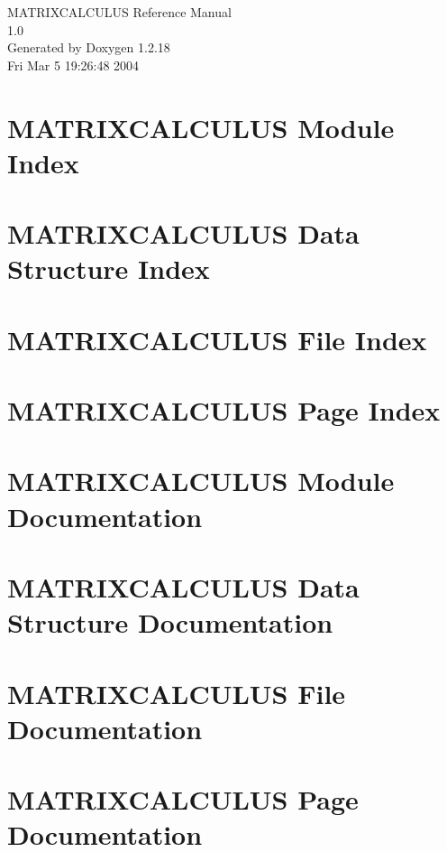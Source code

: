 \documentclass[a4paper]{book}
\begin{document}
\begin{titlepage}
\vspace*{7cm}
\begin{center}
{\Large MATRIXCALCULUS Reference Manual\\[1ex]\large 1.0}\\
\vspace*{1cm}
{\large Generated by Doxygen 1.2.18}\\
\vspace*{0.5cm}
{\small Fri Mar 5 19:26:48 2004}\\
\end{center}
\end{titlepage}
\clearemptydoublepage
{}
\tableofcontents
\clearemptydoublepage
{}
\chapter{MATRIXCALCULUS Module Index}

\chapter{MATRIXCALCULUS Data Structure Index}

\chapter{MATRIXCALCULUS File Index}

\chapter{MATRIXCALCULUS Page Index}

\chapter{MATRIXCALCULUS Module Documentation}






\chapter{MATRIXCALCULUS Data Structure Documentation}


\chapter{MATRIXCALCULUS File Documentation}











\chapter{MATRIXCALCULUS Page Documentation}


\printindex
\end{document}
